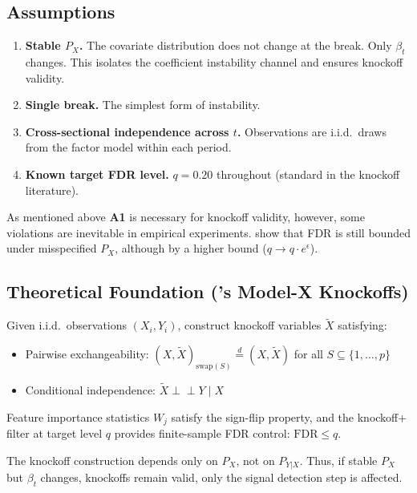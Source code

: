 \documentclass[12pt, a4paper]{article}
\begin{document}
\subsection{Assumptions}

\begin{enumerate}[leftmargin=*, label=\textbf{A\arabic*.}]
    \item \textbf{Stable $P_X$.} The covariate distribution does not change at the break. Only $\beta_t$ changes. This isolates the coefficient instability channel and ensures knockoff validity.
    \item \textbf{Single break.} The simplest form of instability.
    \item \textbf{Cross-sectional independence across $t$.} Observations are i.i.d.\ draws from the factor model within each period. 
    \item \textbf{Known target FDR level.} $q = 0.20$ throughout (standard in the knockoff literature).
\end{enumerate}

As mentioned above \textbf{A1} is necessary for knockoff validity, however, some violations are inevitable in empirical experiments. \citet{barber2020} show that FDR is still bounded under misspecified $P_X$, although by a higher bound ($q \to q \cdot e^\epsilon$). 

\subsection{Theoretical Foundation (\citet{candes2018}'s Model-X Knockoffs)}

Given i.i.d.\ observations $(X_i, Y_i)$, construct knockoff variables $\tilde{X}$ satisfying:
\begin{itemize}[leftmargin=*, itemsep=2pt]
    \item Pairwise exchangeability: $(X, \tilde{X})_{\text{swap}(S)} \stackrel{d}{=} (X, \tilde{X})$ for all $S \subseteq \{1,\ldots,p\}$
    \item Conditional independence: $\tilde{X} \perp\!\!\!\perp Y \mid X$
\end{itemize}

Feature importance statistics $W_j$ satisfy the sign-flip property, and the knockoff+ filter at target level $q$ provides finite-sample FDR control: $\text{FDR} \leq q$.

The knockoff construction depends only on $P_X$, not on $P_{Y|X}$. Thus, if stable $P_X$  but $\beta_t$ changes, knockoffs remain valid, only the signal detection step is affected.
\end{document}
